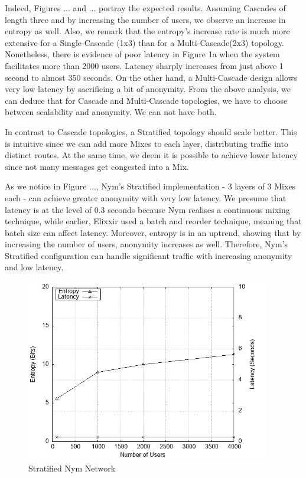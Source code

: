\documentclass[logo,msc,cyber]{infthesis}   %
\begin{document}
 Indeed, Figures ... and ... portray the expected results. Assuming Cascades of
 length three and by increasing the number of users, we observe an increase in
 entropy as well. Also, we remark that the entropy's increase rate is much more
 extensive for a Single-Cascade (1x3) than for a Multi-Cascade(2x3) topology.
 Nonetheless, there is evidence of poor latency in Figure 1a when the system
 facilitates more than 2000 users. Latency sharply increases from just above 1
 second to almost 350 seconds. On the other hand, a Multi-Cascade design allows
 very low latency by sacrificing a bit of anonymity. From the above analysis, we
 can deduce that for Cascade and Multi-Cascade topologies, we have to choose
 between scalability and anonymity. We can not have both.

 In contrast to Cascade topologies, a Stratified topology should scale better.
 This is intuitive since we can add more Mixes to each layer, distributing
 traffic into distinct routes. At the same time, we deem it is possible to
 achieve lower latency since not many messages get congested into a Mix. 

 As we notice in Figure ..., Nym's Stratified implementation - 3 layers
 of 3 Mixes each - can achieve greater anonymity with very low latency. We
 presume that latency is at the level of 0.3 seconds because Nym realises a
 continuous mixing technique, while earlier, Elixxir used a batch and reorder
 technique, meaning that batch size can affect latency. Moreover, entropy is in
 an uptrend, showing that by increasing the number of users, anonymity increases
 as well. Therefore, Nym's Stratified configuration can handle significant
 traffic with increasing anonymity and low latency.

\begin{figure}[h!]
    \centering
    \includegraphics[height=8cm]{figures/simulator/2.png}
    \caption{Stratified Nym Network}
    \label{fig:nym-stratified}
 \end{figure}
\end{document}
